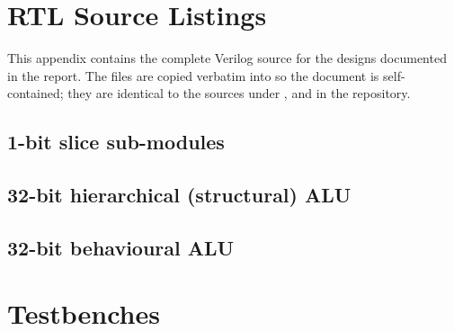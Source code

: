 \chapter{RTL Source Listings}
\label{app:rtl}

This appendix contains the complete Verilog source for the designs
documented in the report. The files are copied verbatim into
 so the document is self-contained; they are
identical to the sources under , 
and  in the repository.

\section{1-bit slice sub-modules}






\section{32-bit hierarchical (structural) ALU}


\section{32-bit behavioural ALU}


\chapter{Testbenches}
\label{app:tb}



